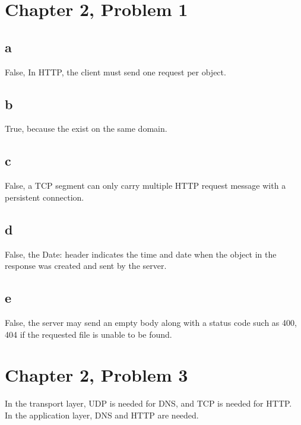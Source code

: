 \documentclass{article}
\begin{document}
\section{Chapter 2, Problem 1}
\subsection{a}
False, In HTTP, the client must send one request per object.\\
\subsection{b}
True, because the exist on the same domain.\\
\subsection{c}
False, a TCP segment can only carry multiple HTTP request message with a persistent connection.\\
\subsection{d}
False, the Date: header indicates the time and date when the object in the response was created and sent by the server.\\
\subsection{e}
False, the server may send an empty body along with a status code such as 400, 404 if the requested file is unable to be found.\\

\section{Chapter 2, Problem 3}
In the transport layer, UDP is needed for DNS, and TCP is needed for HTTP.\\
\newline  In the application layer, DNS and HTTP are needed.\\
\end{document}

